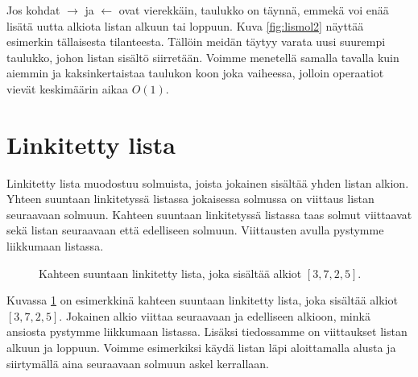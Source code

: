 Jos kohdat $\rightarrow$ ja $\leftarrow$ ovat vierekkäin,
taulukko on täynnä, emmekä voi enää lisätä uutta alkiota
listan alkuun tai loppuun.
Kuva \ref{fig:lismol2} näyttää esimerkin tällaisesta tilanteesta.
Tällöin meidän täytyy varata uusi suurempi taulukko,
johon listan sisältö siirretään.
Voimme menetellä samalla tavalla kuin aiemmin ja
kaksinkertaistaa taulukon koon joka vaiheessa,
jolloin operaatiot vievät keskimäärin aikaa $O(1)$.

\section{Linkitetty lista}

Linkitetty lista muodostuu solmuista, joista jokainen sisältää
yhden listan alkion.
Yhteen suuntaan linkitetyssä listassa jokaisessa
solmussa on viittaus listan seuraavaan solmuun.
Kahteen suuntaan linkitetyssä listassa taas
solmut viittaavat sekä listan seuraavaan että edelliseen solmuun.
Viittausten avulla pystymme liikkumaan listassa.

\begin{figure}
\center
{}
\caption{Kahteen suuntaan linkitetty lista, joka sisältää alkiot $[3,7,2,5]$.}
\label{fig:linlis}
\end{figure}

Kuvassa \ref{fig:linlis} on esimerkkinä kahteen suuntaan linkitetty lista,
joka sisältää alkiot $[3,7,2,5]$.
Jokainen alkio viittaa seuraavaan ja edelliseen alkioon,
minkä ansiosta pystymme liikkumaan listassa.
Lisäksi tiedossamme on viittaukset listan alkuun ja loppuun.
Voimme esimerkiksi käydä listan läpi aloittamalla alusta
ja siirtymällä aina seuraavaan solmuun askel kerrallaan.

